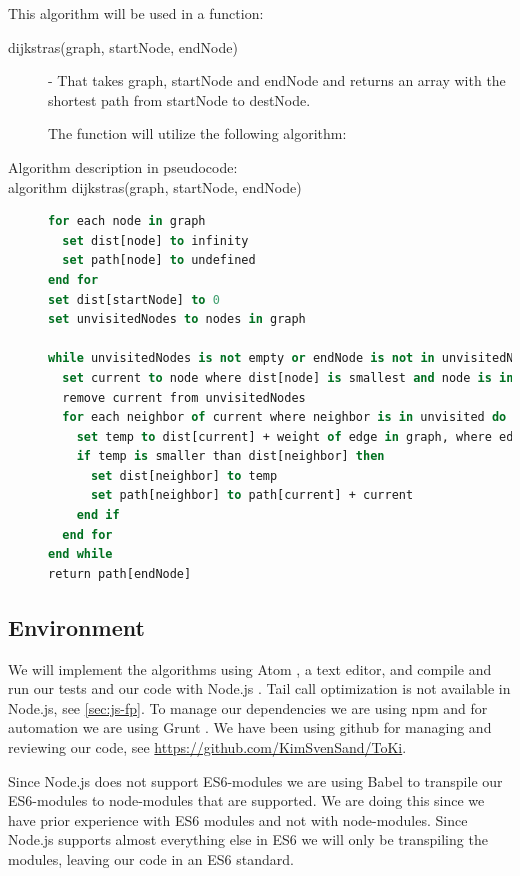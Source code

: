 \documentclass {article}
\begin{document}
This algorithm will be used in a function:
\begin{description}
\item[dijkstras(graph, startNode, endNode)] - That takes graph, startNode and endNode and returns an array with the shortest path from startNode to destNode. 
 
The function will utilize the following algorithm:
\item [Algorithm description in pseudocode:]
\item[algorithm dijkstras(graph, startNode, endNode)]
\item[]
\begin{lstlisting}[language=Pascal]
for each node in graph
  set dist[node] to infinity
  set path[node] to undefined
end for
set dist[startNode] to 0
set unvisitedNodes to nodes in graph
 
while unvisitedNodes is not empty or endNode is not in unvisitedNodes do
  set current to node where dist[node] is smallest and node is in unvisitedNodes 
  remove current from unvisitedNodes
  for each neighbor of current where neighbor is in unvisited do
    set temp to dist[current] + weight of edge in graph, where edge is from current to neighbor
    if temp is smaller than dist[neighbor] then
      set dist[neighbor] to temp
      set path[neighbor] to path[current] + current
    end if
  end for
end while
return path[endNode]
\end{lstlisting}
\end{description}
\subsection{Environment}
We will implement the algorithms using Atom \cite{atom}, a text editor, and compile and run our tests and our code with Node.js \cite{nodejs}. Tail call optimization is not available in Node.js, see \ref{sec:js-fp}. To manage our dependencies we are using npm \cite{npm} and for automation we are using Grunt \cite{grunt}. We have been using github for managing and reviewing our code, see \url{https://github.com/KimSvenSand/ToKi}.
 
Since Node.js does not support ES6-modules we are using Babel \cite{babel} to transpile our ES6-modules to node-modules that are supported. We are doing this since we have prior experience with ES6 modules and not with node-modules. Since Node.js supports almost everything else in ES6 we will only be transpiling the modules, leaving our code in an ES6 standard.
 
\end{document}
